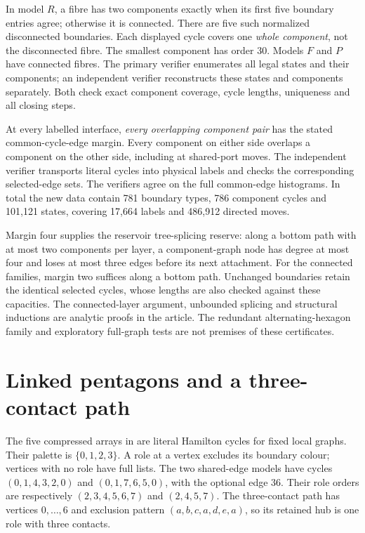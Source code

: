 In model $R$, a fibre has two components exactly when its first five
boundary entries agree; otherwise it is connected. There are five such
normalized disconnected boundaries. Each displayed cycle covers one
\emph{whole component}, not the disconnected fibre. The smallest
component has order $30$. Models $F$ and $P$ have connected fibres.
The primary verifier enumerates all legal states and their components; an
independent verifier reconstructs these states and components separately.
Both check exact component coverage, cycle lengths, uniqueness and all
closing steps.

At every labelled interface, \emph{every overlapping component pair}
has the stated common-cycle-edge margin. Every component on either
side overlaps a component on the other side, including at shared-port
moves. The independent verifier transports literal cycles into physical
labels and checks the corresponding selected-edge sets.
The verifiers agree on the full common-edge histograms. In total the new data
contain 781 boundary types, 786 component cycles and 101,121 states,
covering 17,664 labels
and 486,912 directed moves.

Margin four supplies the reservoir tree-splicing reserve: along a bottom
path with at most two components per layer, a component-graph node has degree
at most four and loses at most three edges before its next attachment.
For the connected families, margin two suffices along a bottom path.
Unchanged boundaries retain the identical selected cycles, whose lengths
are also checked against these capacities. The connected-layer argument,
unbounded splicing and structural inductions are analytic proofs in the
article. The redundant alternating-hexagon family and exploratory
full-graph tests are not premises of these certificates.

\clearpage
\section{Linked pentagons and a three-contact path}
\label{app:extended-cycle-certificates}
The five compressed arrays in  are literal
Hamilton cycles for fixed local graphs. Their palette is $\{0,1,2,3\}$.
A role at a vertex excludes its boundary colour; vertices with no role
have full lists. The two shared-edge models have cycles
$(0,1,4,3,2,0)$ and $(0,1,7,6,5,0)$, with the optional edge $36$.
Their role orders are respectively $(2,3,4,5,6,7)$ and $(2,4,5,7)$.
The three-contact path has vertices $0,\ldots,6$ and exclusion pattern
$(a,b,c,a,d,e,a)$, so its retained hub is one role with three contacts.

